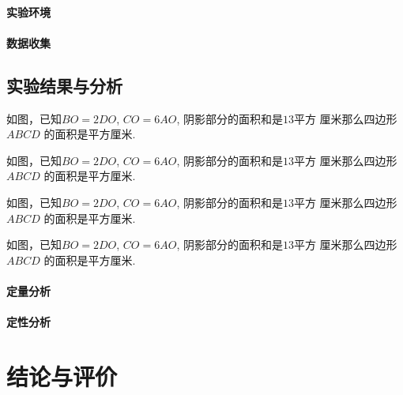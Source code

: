\documentclass{USTBBook}
\begin{document}
\subsection{实验环境}
\zhlipsum[12]

\subsection{数据收集}
\zhlipsum[13]

\chapter{实验结果与分析}
\zhlipsum[14]


\begin{question*}
  如图，已知$BO=2DO$, $CO=6AO$, 阴影部分的面积和是$13$平方
  厘米那么四边形 $ABCD$ 的面积是\fillin[]平方厘米.
\end{question*}

\begin{question*}
  如图，已知$BO=2DO$, $CO=6AO$, 阴影部分的面积和是$13$平方
  厘米那么四边形 $ABCD$ 的面积是\fillin[]平方厘米.
\end{question*}

\begin{question*}
  如图，已知$BO=2DO$, $CO=6AO$, 阴影部分的面积和是$13$平方
  厘米那么四边形 $ABCD$ 的面积是\fillin[]平方厘米.
\end{question*}

\begin{question*}
  如图，已知$BO=2DO$, $CO=6AO$, 阴影部分的面积和是$13$平方
  厘米那么四边形 $ABCD$ 的面积是\fillin[]平方厘米.
\end{question*}

\subsection{定量分析}
\zhlipsum[16]

\subsection{定性分析}
\zhlipsum[17]

\part{结论与评价}
\end{document}
